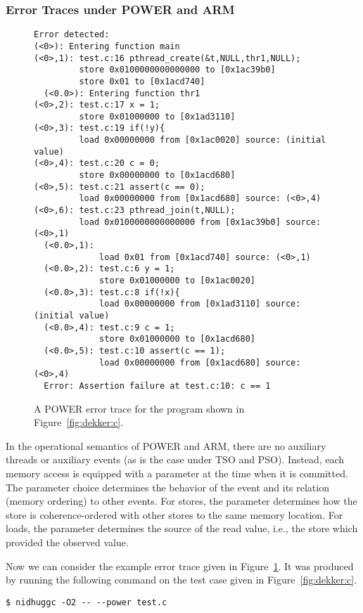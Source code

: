 \documentclass[a4paper]{article}
\begin{document}
\subsubsection{Error Traces under POWER and ARM}

\begin{figure}
\begin{verbatim}
Error detected:
(<0>): Entering function main
(<0>,1): test.c:16 pthread_create(&t,NULL,thr1,NULL);
         store 0x0100000000000000 to [0x1ac39b0]
         store 0x01 to [0x1acd740]
  (<0.0>): Entering function thr1
(<0>,2): test.c:17 x = 1;
         store 0x01000000 to [0x1ad3110]
(<0>,3): test.c:19 if(!y){
         load 0x00000000 from [0x1ac0020] source: (initial value)
(<0>,4): test.c:20 c = 0;
         store 0x00000000 to [0x1acd680]
(<0>,5): test.c:21 assert(c == 0);
         load 0x00000000 from [0x1acd680] source: (<0>,4)
(<0>,6): test.c:23 pthread_join(t,NULL);
         load 0x0100000000000000 from [0x1ac39b0] source: (<0>,1)
  (<0.0>,1):
             load 0x01 from [0x1acd740] source: (<0>,1)
  (<0.0>,2): test.c:6 y = 1;
             store 0x01000000 to [0x1ac0020]
  (<0.0>,3): test.c:8 if(!x){
             load 0x00000000 from [0x1ad3110] source: (initial value)
  (<0.0>,4): test.c:9 c = 1;
             store 0x01000000 to [0x1acd680]
  (<0.0>,5): test.c:10 assert(c == 1);
             load 0x00000000 from [0x1acd680] source: (<0>,4)
  Error: Assertion failure at test.c:10: c == 1
\end{verbatim}
\caption{A POWER error trace for the program shown in Figure~\ref{fig:dekker:c}.}\label{fig:ex:error:trace:dekker:power}
\end{figure}

In the operational semantics of POWER and ARM, there are no auxiliary
threads or auxiliary events (as is the case under TSO and
PSO). Instead, each memory access is equipped with a parameter at the
time when it is committed. The parameter choice determines the
behavior of the event and its relation (memory ordering) to other
events. For stores, the parameter determines how the store is
coherence-ordered with other stores to the same memory location. For
loads, the parameter determines the source of the read value, i.e.,
the store which provided the observed value.

Now we can consider the example error trace given in
Figure~\ref{fig:ex:error:trace:dekker:power}. It was produced by
running the following command on the test case given in
Figure~\ref{fig:dekker:c}.

\noindent
\begin{verbatim}
$ nidhuggc -O2 -- --power test.c
\end{verbatim}
\end{document}
